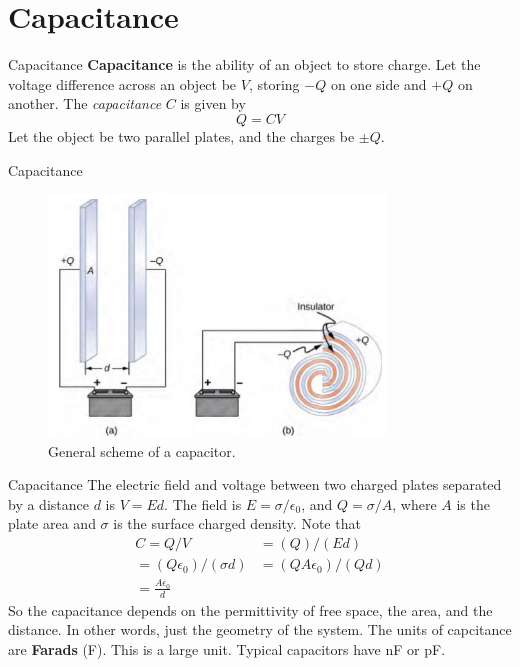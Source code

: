 \documentclass{beamer}
\begin{document}
\section{Capacitance}

\begin{frame}{Capacitance}
\textbf{Capacitance} is the ability of an object to store charge.  Let the voltage difference across an object be $V$, storing $-Q$ on one side and $+Q$ on another.  The \textit{capacitance} $C$ is given by
\begin{equation}
Q = C V
\end{equation}
Let the object be two parallel plates, and the charges be $\pm Q$.
\end{frame}

\begin{frame}{Capacitance}
\begin{figure}
\centering
\includegraphics[width=0.8\textwidth]{figures/cap.png}
\caption{\label{fig:cap} General scheme of a capacitor.}
\end{figure}
\end{frame}

\begin{frame}{Capacitance}
The electric field and voltage between two charged plates separated by a distance $d$ is $V = Ed$.  The field is $E = \sigma/\epsilon_0$, and $Q = \sigma/A$, where $A$ is the plate area and $\sigma$ is the surface charged density.  Note that
\begin{align}
C = Q/V &= (Q)/(E d) \\
= (Q \epsilon_0)/(\sigma d) &= (Q A \epsilon_0)/(Q d) \\
= \frac{A \epsilon_0}{d} &
\end{align}
So the capacitance depends on the permittivity of free space, the area, and the distance.  In other words, just the geometry of the system.  The units of capcitance are \textbf{\alert{Farads}} (F).  This is a large unit.  Typical capacitors have nF or pF.
\end{frame}
\end{document}
